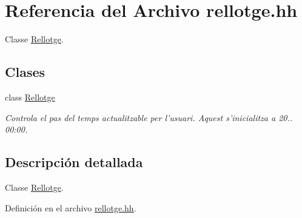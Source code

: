 \hypertarget{rellotge_8hh}{\section{Referencia del Archivo rellotge.\-hh}
\label{rellotge_8hh}
}


Classe \hyperlink{class_rellotge}{Rellotge}.  


\subsection*{Clases}
\begin{DoxyCompactItemize}
\item 
class \hyperlink{class_rellotge}{Rellotge}
\begin{DoxyCompactList}\small\item\em Controla el pas del temps actualitzable per l'usuari. Aquest s'inicialitza a 20.. 00\-:00. \end{DoxyCompactList}\end{DoxyCompactItemize}


\subsection{Descripción detallada}
Classe \hyperlink{class_rellotge}{Rellotge}. 

Definición en el archivo \hyperlink{rellotge_8hh_source}{rellotge.\-hh}.

